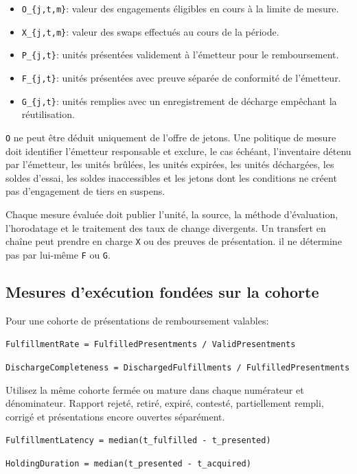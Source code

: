 \documentclass[11pt]{article}
\begin{document}
\begin{itemize}[leftmargin=*]
\item \texttt{O\_\{j,t,m\}}: valeur des engagements éligibles en cours à la limite de mesure.
\item \texttt{X\_\{j,t,m\}}: valeur des swaps effectués au cours de la période.
\item \texttt{P\_\{j,t\}}: unités présentées validement à l'émetteur pour le remboursement.
\item \texttt{F\_\{j,t\}}: unités présentées avec preuve séparée de conformité de l'émetteur.
\item \texttt{G\_\{j,t\}}: unités remplies avec un enregistrement de décharge empêchant la réutilisation.
\end{itemize}
\texttt{O} ne peut être déduit uniquement de l'offre de jetons. Une politique de mesure doit identifier l'émetteur responsable et exclure, le cas échéant, l'inventaire détenu par l'émetteur, les unités brûlées, les unités expirées, les unités déchargées, les soldes d'essai, les soldes inaccessibles et les jetons dont les conditions ne créent pas d'engagement de tiers en suspens.

Chaque mesure évaluée doit publier l'unité, la source, la méthode d'évaluation, l'horodatage et le traitement des taux de change divergents. Un transfert en chaîne peut prendre en charge \texttt{X} ou des preuves de présentation. il ne détermine pas par lui-même \texttt{F} ou \texttt{G}.

\subsection*{Mesures d'exécution fondées sur la cohorte}

Pour une cohorte de présentations de remboursement valables:

\texttt{FulfillmentRate = FulfilledPresentments / ValidPresentments}

\texttt{DischargeCompleteness = DischargedFulfillments / FulfilledPresentments}

Utilisez la même cohorte fermée ou mature dans chaque numérateur et dénominateur. Rapport rejeté, retiré, expiré, contesté, partiellement rempli, corrigé et présentations encore ouvertes séparément.

\texttt{FulfillmentLatency = median(t\_fulfilled - t\_presented)}

\texttt{HoldingDuration = median(t\_presented - t\_acquired)}
\end{document}
